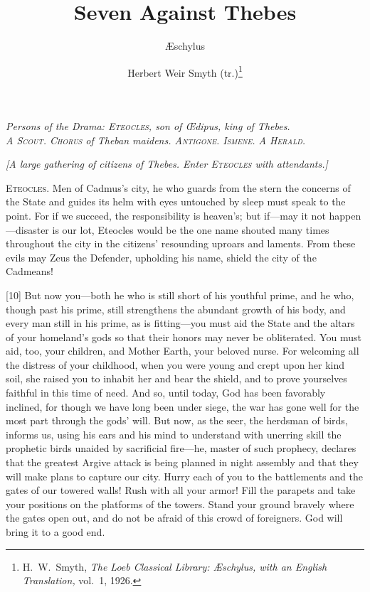 \documentclass[12pt]{article}
\title{Seven Against Thebes}
\author{{\AE}schylus \and Herbert Weir Smyth (tr.)\footnote{H.~W.~Smyth, \textit{The Loeb Classical Library: {\AE}schylus, with an English Translation,} vol.~1, 1926.}}
\date{}
\begin{document}
\maketitle

\begin{center}
\textit{Persons of the Drama: \textsc{Eteocles,} son of {\OE}dipus, king of Thebes.\\A \textsc{Scout. Chorus} of Theban maidens. \textsc{Antigone. Ismene.} A \textsc{Herald.}}
\end{center}

\begin{center}
\textit{[A large gathering of citizens of Thebes. Enter \textsc{Eteocles} with attendants.]}
\end{center}

\textsc{Eteocles.} Men of Cadmus's city, he who guards from the stern the concerns of the State and guides its helm with eyes untouched by sleep must speak to the point. For if we succeed, the responsibility is heaven's; but if—may it not happen—disaster is our lot, Eteocles would be the one name shouted many times throughout the city in the citizens' resounding uproars and laments. From these evils may Zeus the Defender, upholding his name, shield the city of the Cadmeans!

[10] But now you—both he who is still short of his youthful prime, and he who, though past his prime, still strengthens the abundant growth of his body, and every man still in his prime, as is fitting—you must aid the State and the altars of your homeland's gods so that their honors may never be obliterated. You must aid, too, your children, and Mother Earth, your beloved nurse. For welcoming all the distress of your childhood, when you were young and crept upon her kind soil, she raised you to inhabit her and bear the shield, and to prove yourselves faithful in this time of need. And so, until today, God has been favorably inclined, for though we have long been under siege, the war has gone well for the most part through the gods' will. But now, as the seer, the herdsman of birds, informs us, using his ears and his mind to understand with unerring skill the prophetic birds unaided by sacrificial fire—he, master of such prophecy, declares that the greatest Argive attack is being planned in night assembly and that they will make plans to capture our city. Hurry each of you to the battlements and the gates of our towered walls! Rush with all your armor! Fill the parapets and take your positions on the platforms of the towers. Stand your ground bravely where the gates open out, and do not be afraid of this crowd of foreigners. God will bring it to a good end.
\end{document}
